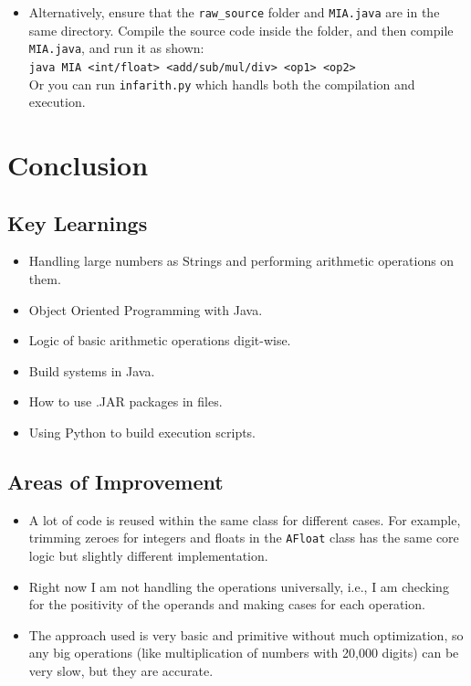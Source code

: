 \documentclass[15pt]{article}
\begin{document}
\begin{itemize}
\begin{itemize}
        \item Example Input:\\
        \texttt{./my\_exe float sub 840196454.51725 712586963.70283}\\
        Output:\\
        \texttt{127609490.81442}
    \end{itemize}
    \item Alternatively, ensure that the \texttt{raw\_source} folder and \texttt{MIA.java} are in the same directory. Compile the source code inside the folder, and then compile \texttt{MIA.java}, and run it as shown:\\\texttt{java MIA <int/float> <add/sub/mul/div> <op1> <op2>}\\Or you can run \texttt{infarith.py} which handls both the compilation and execution.
\end{itemize}

\section{Conclusion}

\subsection{Key Learnings}

\begin{itemize}
    \item Handling large numbers as Strings and performing arithmetic operations on them.
    \item Object Oriented Programming with Java.
    \item Logic of basic arithmetic operations digit-wise.
    \item Build systems in Java.
    \item How to use .JAR packages in files.
    \item Using Python to build execution scripts.
\end{itemize}

\subsection{Areas of Improvement}

\begin{itemize}
    \item A lot of code is reused within the same class for different cases. For example, trimming zeroes for integers and floats in the \texttt{AFloat} class has the same core logic but slightly different implementation.
    \item Right now I am not handling the operations universally, i.e., I am checking for the positivity of the operands and making cases for each operation.
    \item The approach used is very basic and primitive without much optimization, so any big operations (like multiplication of numbers with 20,000 digits) can be very slow, but they are accurate.
\end{itemize}
\end{document}
